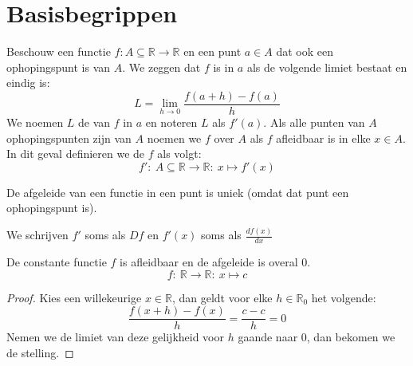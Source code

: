 \documentclass[main.tex]{subfiles}
\begin{document}
\section{Basisbegrippen}
\label{sec:basisbegrippen}

\begin{de}
  Beschouw een functie $f: A \subseteq \mathbb{R} \rightarrow \mathbb{R}$ en een punt $a\in A$ dat ook een ophopingspunt is van $A$.
  We zeggen dat $f$  is in $a$ als de volgende limiet bestaat en eindig is:
  \[ L = \lim_{h\rightarrow 0}\frac{f(a+h)-f(a)}{h} \]
  We noemen $L$ de  van $f$ in $a$ en noteren $L$ als $f'(a)$.
  Als alle punten van $A$ ophopingspunten zijn van $A$ noemen we $f$  over $A$ als $f$ afleidbaar is in elke $x\in A$.
  In dit geval definieren we de  $f$ als volgt:
  \[ f':\ A \subseteq \mathbb{R} \rightarrow \mathbb{R}:\ x \mapsto f'(x) \]
\end{de}

\begin{st}
  De afgeleide van een functie in een punt is uniek (omdat dat punt een ophopingspunt is).
\end{st}


\begin{de}
  We schrijven $f'$ soms als $Df$ en $f'(x)$ soms als $\frac{df(x)}{dx}$
\end{de}

\begin{vb}
  De constante functie $f$ is afleidbaar en de afgeleide is overal $0$.
  \[ f:\ \mathbb{R} \rightarrow \mathbb{R}:\ x \mapsto c \]

  \begin{proof}
    Kies een willekeurige $x \in \mathbb{R}$, dan geldt voor elke $h\in \mathbb{R}_{0}$ het volgende:
    \[ \frac{f(x+h)-f(x)}{h} = \frac{c-c}{h} = 0 \]
    Nemen we de limiet van deze gelijkheid voor $h$ gaande naar $0$, dan bekomen we de stelling.
  \end{proof}
\end{vb}
\end{document}
